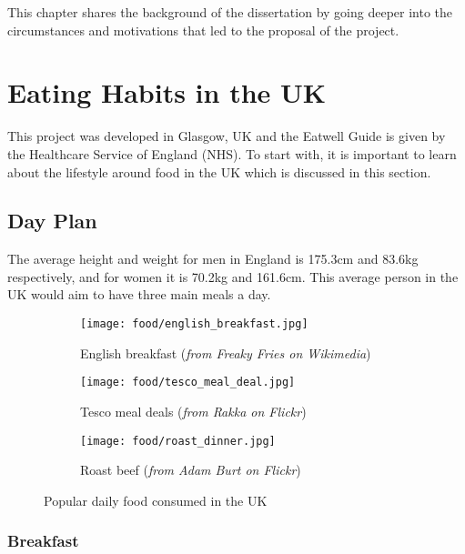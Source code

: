 \documentclass[../main.tex]{subfiles}
\begin{document}
This chapter shares the background of the dissertation by going deeper into the circumstances and motivations that led to the proposal of the project.

\section{Eating Habits in the UK}

This project was developed in Glasgow, UK and the Eatwell Guide is given by the Healthcare Service of England (NHS). To start with, it is important to learn about the lifestyle around food in the UK which is discussed in this section.

\subsection{Day Plan}

The average height and weight for men in England is 175.3cm and 83.6kg respectively, and for women it is 70.2kg and 161.6cm\cite{StatisticsRevealBritain2010}. This average person in the UK would aim to have three main meals a day.

\begin{figure}
    \centering
    \noindent\begin{subfigure}{.3\textwidth}
    \texttt{[image: food/english\_breakfast.jpg]}
    \caption{English breakfast (\textit{from Freaky Fries on Wikimedia})}
    \end{subfigure}\hfill
    \begin{subfigure}{.3\textwidth}
    \texttt{[image: food/tesco\_meal\_deal.jpg]}
    \caption{Tesco meal deals (\textit{from Rakka on Flickr})}
    \end{subfigure}\hfill
    \begin{subfigure}{.3\textwidth}
    \texttt{[image: food/roast\_dinner.jpg]}
    \caption{Roast beef (\textit{from Adam Burt on Flickr})}
    \end{subfigure}
    \caption{Popular daily food consumed in the UK}
\end{figure}

\subsubsection{Breakfast}
\end{document}
